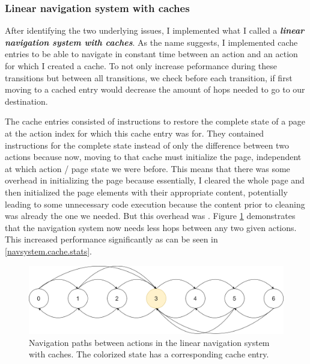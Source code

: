 \subsubsection{Linear navigation system with caches}

After identifying the two underlying issues, I implemented what I called a \textbf{\textit{linear navigation system with caches}}. As the name suggests, I implemented cache entries to be able to navigate in constant time between an action and an action for which I created a cache. To not only increase peformance during these transitions but between all transitions, we check before each transition, if first moving to a cached entry would decrease the amount of hops needed to go to our destination.

\par

The cache entries consisted of instructions to restore the complete state of a page at the action index for which this cache entry was for. They contained instructions for the complete state instead of only the difference between two actions because now, moving to that cache must initialize the page, independent at which action / page state we were before. This means that there was some overhead in initializing the page because essentially, I cleared the whole page and then initialized the page elements with their appropriate content, potentially leading to some unnecessary code execution because the content prior to cleaning was already the one we needed. But this overhead was . Figure \ref{navsystem.cache.overview} demonstrates that the navigation system now needs less hops between any two given actions. This increased performance significantly as can be seen in \ref{navsystem.cache.stats}. \par

\begin{figure}
\caption{Navigation paths between actions in the linear navigation system with caches. The colorized state has a corresponding cache entry.}
\label{navsystem.cache.overview}
\includegraphics[width=\textwidth]{figures/navigationsystem-cache-overview-2.png}
\end{figure}

